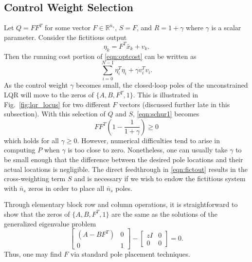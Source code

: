 \documentclass[twocolumn,twoside]{IEEEtran}
\newcommand{\xd}{\ensuremath{\bar x }\xspace}
\begin{document}
\subsection{Control Weight Selection}
Let $Q = FF^T$ for some vector $F\in\mathds{R}^{\bar{n}_s}$, $S=F$, and $R=1+\gamma$ where $\gamma$ is a scalar parameter. Consider the fictitious output
\begin{equation}
  \eta_k = F^T\xd_k + v_k. \label{eqn:fictout}
\end{equation}
Then the running cost portion of \eqref{eqn:optcost} can be written as
\begin{equation}
   \sum_{i=0}^{N-1} \eta_i^T\eta_i + \gamma v_i^T v_i.
\end{equation}
As the control weight $\gamma$ becomes small, the closed-loop poles of the unconstrained LQR
will move to the zeros of $\{A, B, F^T, 1\}$. This is illustrated in Fig.~\ref{fig:lqr_locus} for two different $F$ vectors (discussed further late in this subsection). With this selection of $Q$ and $S$, \eqref{eqn:schur1} becomes
\begin{equation}
FF^T\left(1 - \frac{1}{1+\gamma} \right)\geq 0
\end{equation}
which holds for all $\gamma\geq 0$. However, numerical difficulties tend to arise in computing $P$ when $\gamma$ is too close to zero. Nonetheless, one can usually take $\gamma$ to be small enough that the difference between the desired pole locations and their actual locations is negligible. The direct feedthrough in \eqref{eqn:fictout} results in the cross-weighting term $S$ and is necessary if we wish to endow the fictitious system with $\bar{n}_s$ zeros in order to place all $\bar{n}_s$ poles.

Through elementary block row and column operations, it is straightforward to show that the zeros of
$\{A, B, F^T, 1\}$ are the same as the solutions of the generalized eigenvalue problem
\begin{equation*}
  \begin{bmatrix}
    (A - BF^T) & 0\\
    0 & 1
  \end{bmatrix} - \begin{bmatrix}zI & 0\\0 & 0\end{bmatrix} = 0.
\end{equation*}
Thus, one may find $F$ via standard pole placement techniques.
\end{document}
